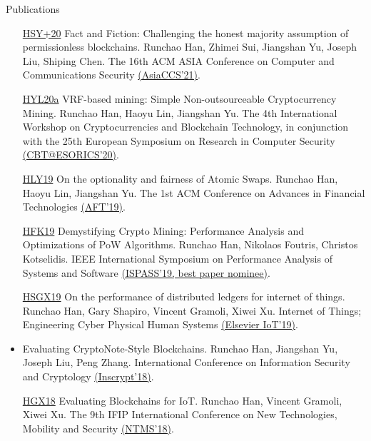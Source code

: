 \documentclass{resume} %
\begin{document}
\begin{rSection}{Publications}
\begin{itemize}
        \item[\href{https://eprint.iacr.org/2019/752}{HSY+20}] Fact and Fiction: Challenging the honest majority assumption of permissionless blockchains. Runchao Han, Zhimei Sui, Jiangshan Yu, Joseph Liu, Shiping Chen. The 16th ACM ASIA Conference on Computer and Communications Security \href{https://dl.acm.org/doi/10.1145/3433210.3453087}{(AsiaCCS'21)}.
        \item[\href{https://github.com/DEX-ware/vrf-mining/blob/master/paper/main.pdf}{HYL20a}] VRF-based mining: Simple Non-outsourceable Cryptocurrency Mining. Runchao Han, Haoyu Lin, Jiangshan Yu. The 4th International Workshop on Cryptocurrencies and Blockchain Technology, in conjunction with the 25th European Symposium on Research in Computer Security \href{https://link.springer.com/chapter/10.1007/978-3-030-66172-4_19}{(CBT@ESORICS'20)}.
        \item[\href{https://eprint.iacr.org/2019/896}{HLY19}] On the optionality and fairness of Atomic Swaps. Runchao Han, Haoyu Lin, Jiangshan Yu. The 1st ACM Conference on Advances in Financial Technologies \href{https://dl.acm.org/doi/10.1145/3318041.3355460}{(AFT'19)}.
        \item[\href{https://www.research.manchester.ac.uk/portal/files/85753741/paper.pdf}{HFK19}] Demystifying Crypto Mining: Performance Analysis and Optimizations of PoW Algorithms. Runchao Han, Nikolaos Foutris, Christos Kotselidis. IEEE International Symposium on Performance Analysis of Systems and Software \href{https://ieeexplore.ieee.org/document/8695663}{(ISPASS'19, best paper nominee)}.
        \item[\href{https://gramoli.redbellyblockchain.io/web/doc/pubs/IoT2019.pdf}{HSGX19}] On the performance of distributed ledgers for internet of things. Runchao Han, Gary Shapiro, Vincent Gramoli, Xiwei Xu. Internet of Things; Engineering Cyber Physical Human Systems \href{https://www.sciencedirect.com/science/article/abs/pii/S2542660518300416}{(Elsevier IoT'19)}.
        \item[\href{https://www.researchgate.net/profile/Runchao_Han/publication/331227984_Evaluating_CryptoNote-Style_Blockchains_14th_International_Conference_Inscrypt_2018_Fuzhou_China_December_14-17_2018_Revised_Selected_Papers/links/5c747901299bf1268d25a5f5/Evaluating-CryptoNote-Style-Blockchains-14th-International-Conference-Inscrypt-2018-Fuzhou-China-December-14-17-2018-Revised-Selected-Papers.pdf}{HYLZ18}] Evaluating CryptoNote-Style Blockchains. Runchao Han, Jiangshan Yu, Joseph Liu, Peng Zhang. International Conference on Information Security and Cryptology \href{https://link.springer.com/chapter/10.1007/978-3-030-14234-6_2}{(Inscrypt'18)}.
        \item[\href{https://gramoli.redbellyblockchain.io/web/doc/pubs2/blockchain-iot.pdf}{HGX18}] Evaluating Blockchains for IoT. Runchao Han, Vincent Gramoli, Xiwei Xu. The 9th IFIP International Conference on New Technologies, Mobility and Security \href{https://ieeexplore.ieee.org/document/8328736}{(NTMS'18)}.
    \end{itemize}

\end{rSection}
\end{document}
